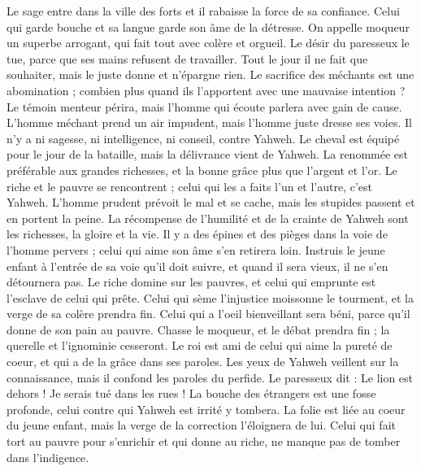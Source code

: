 \begin{multicols}{2}
Le sage entre dans la ville des forts et il rabaisse la force de sa confiance.
Celui qui garde bouche et sa langue garde son âme de la détresse.
On appelle moqueur un superbe arrogant, qui fait tout avec colère et orgueil.
Le désir du paresseux le tue, parce que ses mains refusent de travailler.
Tout le jour il ne fait que souhaiter, mais le juste donne et n'épargne rien.
Le sacrifice des méchants est une abomination ; combien plus quand ils l'apportent avec une mauvaise intention ?
Le témoin menteur périra, mais l'homme qui écoute parlera avec gain de cause.
L'homme méchant prend un air impudent, mais l'homme juste dresse ses voies.
Il n'y a ni sagesse, ni intelligence, ni conseil, contre Yahweh.
Le cheval est équipé pour le jour de la bataille, mais la délivrance vient de Yahweh.
\VerseOne{}La renommée est préférable aux grandes richesses, et la bonne grâce plus que l'argent et l'or.
Le riche et le pauvre se rencontrent ; celui qui les a faits l'un et l'autre, c'est Yahweh.
L'homme prudent prévoit le mal et se cache, mais les stupides passent et en portent la peine.
La récompense de l'humilité et de la crainte de Yahweh sont les richesses, la gloire et la vie.
Il y a des épines et des pièges dans la voie de l'homme pervers ; celui qui aime son âme s'en retirera loin.
Instruis le jeune enfant à l'entrée de sa voie qu'il doit suivre, et quand il sera vieux, il ne s'en détournera pas.
Le riche domine sur les pauvres, et celui qui emprunte est l'esclave de celui qui prête.
Celui qui sème l'injustice moissonne le tourment, et la verge de sa colère prendra fin.
Celui qui a l'oeil bienveillant sera béni, parce qu'il donne de son pain au pauvre.
Chasse le moqueur, et le débat prendra fin ; la querelle et l'ignominie cesseront.
Le roi est ami de celui qui aime la pureté de coeur, et qui a de la grâce dans ses paroles.
Les yeux de Yahweh veillent sur la connaissance, mais il confond les paroles du perfide.
Le paresseux dit : Le lion est dehors ! Je serais tué dans les rues !
La bouche des étrangers est une fosse profonde, celui contre qui Yahweh est irrité y tombera.
La folie est liée au coeur du jeune enfant, mais la verge de la correction l'éloignera de lui.
Celui qui fait tort au pauvre pour s'enrichir et qui donne au riche, ne manque pas de tomber dans l'indigence.

\end{multicols}
